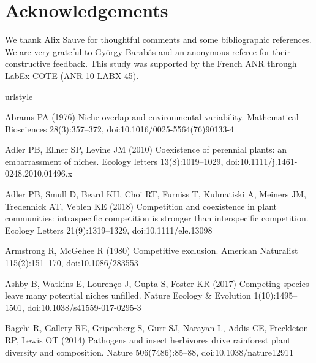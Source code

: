 \documentclass[a4paper,12pt]{article}
\begin{document}
\section*{Acknowledgements}

We thank Alix Sauve for thoughtful comments and some bibliographic
references. We are very grateful to Gy\"orgy Barab\'as and an anonymous
referee for their constructive feedback. This study was supported
by the French ANR through LabEx COTE (ANR-10-LABX-45).

\begin{thebibliography}{68}
\providecommand{\natexlab}[1]{#1}
\providecommand{\url}[1]{{#1}}
\providecommand{\urlprefix}{URL }
\expandafter\ifx\csname urlstyle\endcsname\relax
  \providecommand{\doi}[1]{DOI~\discretionary{}{}{}#1}\else
  \providecommand{\doi}{DOI~\discretionary{}{}{}\begingroup
  \urlstyle{rm}\Url}\fi
\providecommand{\eprint}[2][]{\url{#2}}

Abrams PA (1976) Niche overlap and environmental variability. Mathematical
  Biosciences 28(3):357--372, doi:{10.1016/0025-5564(76)90133-4}

Adler PB, Ellner SP, Levine JM (2010) Coexistence of perennial plants: an
  embarrassment of niches. Ecology letters 13(8):1019--1029,
  doi:{10.1111/j.1461-0248.2010.01496.x}

Adler PB, Smull D, Beard KH, Choi RT, Furniss T, Kulmatiski A, Meiners JM,
  Tredennick AT, Veblen KE (2018) Competition and coexistence in plant
  communities: intraspecific competition is stronger than interspecific
  competition. Ecology Letters 21(9):1319--1329, doi:{10.1111/ele.13098}

Armstrong R, McGehee R (1980) Competitive exclusion. American Naturalist
  115(2):151--170, doi:{10.1086/283553}

Ashby B, Watkins E, Louren\c{c}o J, Gupta S, Foster KR (2017) Competing species
  leave many potential niches unfilled. Nature Ecology \& Evolution
  1(10):1495--1501, doi:{10.1038/s41559-017-0295-3}

Bagchi R, Gallery RE, Gripenberg S, Gurr SJ, Narayan L, Addis CE, Freckleton
  RP, Lewis OT (2014) Pathogens and insect herbivores drive rainforest plant
  diversity and composition. Nature 506(7486):85--88, doi:{10.1038/nature12911}


\end{thebibliography}
\end{document}
